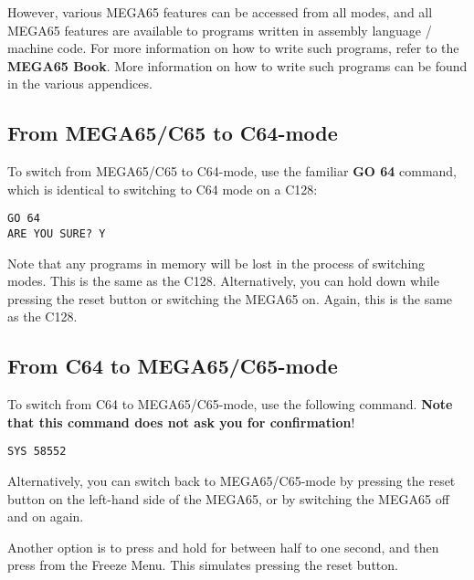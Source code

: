 However, various MEGA65 features can be accessed from all modes, and all MEGA65 features are available
to programs written in assembly language / machine code.
\ifdefined\printmanual
For more information on how to write such programs, refer to the {\bf MEGA65 Book}.
\else
More information on how to write such programs can be found in the various appendices.
\fi

\subsection{From MEGA65/C65 to C64-mode}

To switch from MEGA65/C65 to C64-mode, use the familiar {\bf GO 64} command, which is identical to switching to C64
mode on a C128:
\begin{tcolorbox}[colback=black,coltext=white]
\verbatimfont{\codefont}
\begin{verbatim}
GO 64
ARE YOU SURE? Y
\end{verbatim}
\end{tcolorbox}

Note that any programs in memory will be lost in the process of switching modes. This is the same as the C128.
Alternatively, you can hold \megasymbolkey down while pressing the reset button or switching the MEGA65 on. Again,
this is the same as the C128.

\subsection{From C64 to MEGA65/C65-mode}

To switch from C64 to MEGA65/C65-mode, use the following command. {\bf Note that this command does not ask you for
confirmation}!

\begin{tcolorbox}[colback=black,coltext=white]
\verbatimfont{\codefont}
\begin{verbatim}
SYS 58552
\end{verbatim}
\end{tcolorbox}

Alternatively, you can switch back to MEGA65/C65-mode by pressing the reset
button on the left-hand side of the MEGA65, or by switching the
MEGA65 off and on again.

Another option is to press and hold  for between half to one second, and then press 
from the Freeze Menu.  This simulates pressing the reset button.

